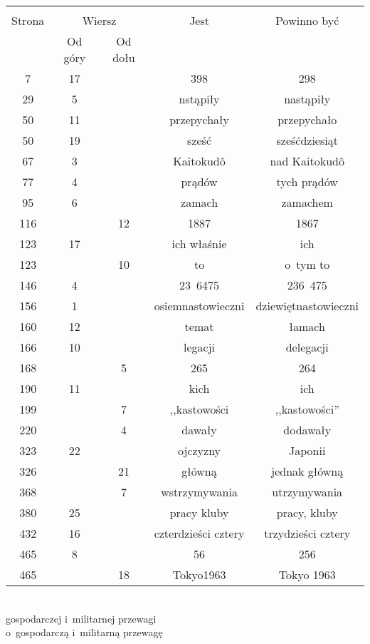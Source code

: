 \documentclass[a4paper,11pt]{article}
\begin{document}
\newpage
{}
\begin{center}
  \begin{tabular}{|c|c|c|c|c|}
    \hline
    & \multicolumn{2}{c|}{} & & \\
    Strona & \multicolumn{2}{c|}{Wiersz} & Jest
                              & Powinno być \\ \cline{2-3}
    & Od góry & Od dołu & & \\
    \hline
    7   & 17 & & 398 & 298 \\
    29  &  5 & & nstąpiły & nastąpiły \\
    50  & 11 & & przepychały & przepychało \\
    50  & 19 & & sześć & sześćdziesiąt \\
    67  &  3 & & Kaitokud\^{o} & nad Kaitokud\^{o} \\
    77  &  4 & & prądów & tych prądów \\
    95  &  6 & & zamach & zamachem \\
    116 & & 12 & 1887 & 1867 \\
    123 & 17 & & ich właśnie & ich \\
    123 & & 10 & to & o~tym to \\
    146 &  4 & & 23~6475 & 236~475 \\
    156 &  1 & & osiemnastowieczni & dziewiętnastowieczni \\
    160 & 12 & & temat & łamach \\
    166 & 10 & & legacji & delegacji \\
    168 & & 5 & 265 & 264 \\
    190 & 11 & & kich & ich \\
    199 & & 7 & ,,kastowości  %
           & ,,kastowości'' \\
    220 & &  4 & dawały & dodawały \\
    323 & 22 & & ojczyzny & Japonii \\
    326 & & 21 & główną & jednak główną \\
    368 & &  7 & wstrzymywania & utrzymywania \\
    380 & 25 & & pracy kluby & pracy, kluby \\
    432 & 16 & & czterdzieści cztery & trzydzieści cztery \\
    465 &  8 & & 56 & 256 \\
    465 & & 18 & Tokyo1963 & Tokyo 1963 \\
    \hline
  \end{tabular}
\end{center}
\noi
{} \\
\Jest  gospodarczej i~militarnej przewagi \\
\Powin o~gospodarczą i~militarną przewagę \\
\end{document}

